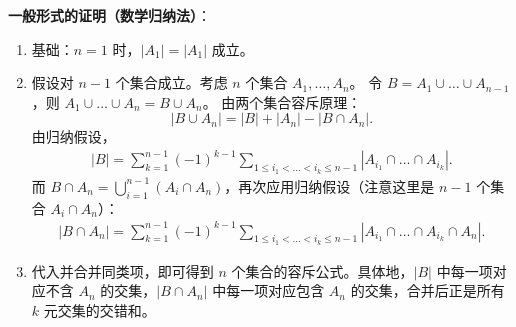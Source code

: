\begin{proofbox}
\textbf{一般形式的证明（数学归纳法）}：
\begin{enumerate}
    \item 基础：$n=1$ 时，$|A_1| = |A_1|$ 成立。
    \item 假设对 $n-1$ 个集合成立。考虑 $n$ 个集合 $A_1, \dots, A_n$。
    令 $B = A_1 \cup \dots \cup A_{n-1}$，则 $A_1 \cup \dots \cup A_n = B \cup A_n$。
    由两个集合容斥原理：
    \[
    |B \cup A_n| = |B| + |A_n| - |B \cap A_n|.
    \]
    由归纳假设，
    \begin{align*}
    |B| = \sum_{k=1}^{n-1} (-1)^{k-1} \sum_{1\le i_1 < \dots < i_k \le n-1} |A_{i_1} \cap \dots \cap A_{i_k}|.
    \end{align*}
    而 $B \cap A_n = \bigcup_{i=1}^{n-1} (A_i \cap A_n)$，再次应用归纳假设（注意这里是 $n-1$ 个集合 $A_i \cap A_n$）：
    \begin{align*}
    |B \cap A_n| = \sum_{k=1}^{n-1} (-1)^{k-1} \sum_{1\le i_1 < \dots < i_k \le n-1} |A_{i_1} \cap \dots \cap A_{i_k} \cap A_n|.
    \end{align*}
    \item 代入并合并同类项，即可得到 $n$ 个集合的容斥公式。具体地，$|B|$ 中每一项对应不含 $A_n$ 的交集，$|B \cap A_n|$ 中每一项对应包含 $A_n$ 的交集，合并后正是所有 $k$ 元交集的交错和。
\end{enumerate}
\end{proofbox}